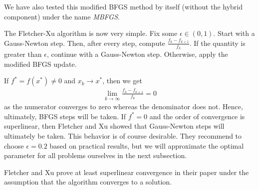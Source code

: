 \documentclass{article}
\theoremstyle{plain}%
\theoremstyle{definition}
\begin{document}
We have also tested this modified BFGS method by itself (without the hybrid component)
under the name \emph{MBFGS}. \par
The Fletcher-Xu algorithm is now very simple. Fix some $\epsilon \in (0,1)$.
 Start with a Gauss-Newton step.
Then, after every step, compute $\frac{f_k-f_{k+1}}{f_{k}}$. If the quantity is greater than
$\epsilon$, continue with a Gauss-Newton step. Otherwise, apply the modified BFGS update. \par
If $f^*=f(x^*)\neq 0$ and $x_k\rightarrow x^*$, then we get 
\begin{align*}
 \lim_{k\rightarrow \infty} \frac{f_k-f_{k+1}}{f_k}=0
\end{align*}
as the numerator converges to zero whereas the denominator does not. Hence, ultimately, BFGS steps
will be taken. If $f^*=0$ and the order of convergence is superlinear, then Fletcher and Xu showed
that Gauss-Newton steps will ultimately be taken. This behavior is of course desirable.
They recommend to choose $\epsilon=0.2$ based on practical results, but we will approximate
the optimal parameter for all problems ourselves in the next subsection. \par
Fletcher and Xu prove at least superlinear convergence in their paper under the assumption that
the  algorithm converges to a solution. 
\end{document}
